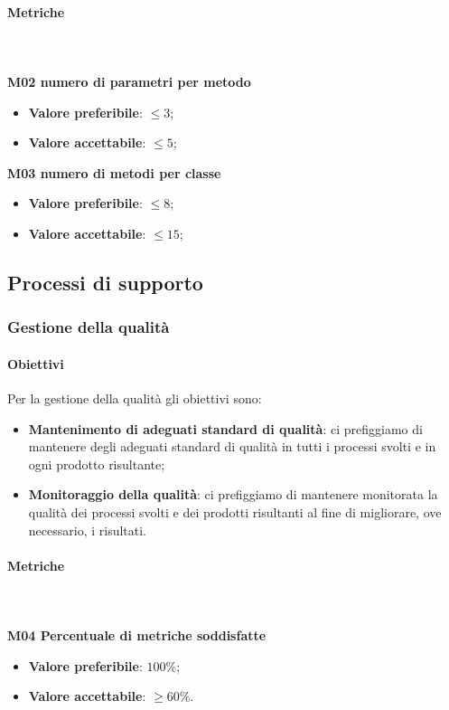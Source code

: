 			\paragraph{Metriche} \mbox{} \\ \\
			\textbf{M02 numero di parametri per metodo} 
			\begin{itemize}
				\item \textbf{Valore preferibile}: $ \le 3$;
				\item \textbf{Valore accettabile}: $ \le 5$;
			\end{itemize}			
			\textbf{M03 numero di metodi per classe} 
			\begin{itemize}
				\item \textbf{Valore preferibile}: $ \le 8$;
				\item \textbf{Valore accettabile}: $ \le 15$;
			\end{itemize}
	
			
	\subsection{Processi di supporto}			
		\subsubsection{Gestione della qualità}
			\paragraph{Obiettivi}
			Per la gestione della qualità gli obiettivi sono:
			\begin{itemize}
				\item \textbf{Mantenimento di adeguati standard di qualità}: ci prefiggiamo di mantenere degli adeguati standard di qualità in tutti i processi svolti e in ogni prodotto risultante;
				\item \textbf{Monitoraggio della qualità}: ci prefiggiamo di mantenere monitorata la qualità dei processi svolti e dei prodotti risultanti al fine di migliorare, ove necessario, i risultati.
			\end{itemize}	 
			\paragraph{Metriche} \mbox{} \\ \\
				\textbf{M04 Percentuale di metriche soddisfatte}
				\begin{itemize}
					\item \textbf{Valore preferibile}: $100\%$;
					\item \textbf{Valore accettabile}: $\ge 60\%$.
				\end{itemize}			

